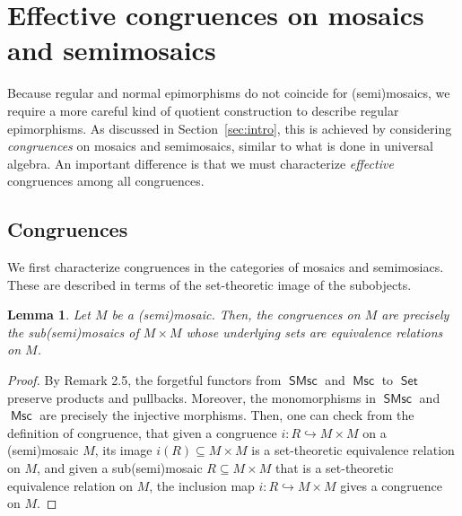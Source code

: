 \documentclass[reqno]{amsart}
\newcommand{\cat}[1]{\ensuremath{\mathsf{#1}}}
\DeclareMathOperator{\Set}{\cat{Set}}
\DeclareMathOperator{\Msc}{\cat{Msc}}
\DeclareMathOperator{\SMsc}{\cat{SMsc}}
\numberwithin{equation}{section}
\theoremstyle{plain}
\newtheorem{lemma}[equation]{Lemma}
\theoremstyle{definition}
\begin{document}
\section{Effective congruences on mosaics and semimosaics}
\label{sec:congruences}


Because regular and normal epimorphisms do not coincide for (semi)mosaics, we require a more careful kind of quotient construction to describe regular epimorphisms. 
As discussed in Section~\ref{sec:intro}, this is achieved by considering \emph{congruences} on mosaics and semimosaics, similar to what is done in universal algebra. 
An important difference is that we must characterize \emph{effective} congruences among all congruences.



\subsection{Congruences}


We first characterize congruences in the categories of mosaics and semimosiacs. These are described in terms of the set-theoretic image of the subobjects.



\begin{lemma}\label{lem:congruences}
    Let $M$ be a (semi)mosaic. Then, the congruences on $M$ are precisely the sub(semi)mosaics of $M\times M$ whose underlying sets are equivalence relations on $M$.
\end{lemma}

\begin{proof}
     By Remark 2.5, the forgetful functors from $\SMsc$ and $\Msc$ to $\Set$ preserve products and pullbacks. Moreover, the monomorphisms in $\SMsc$ and $\Msc$ are precisely the injective morphisms. Then, one can check from the definition of congruence, that given a congruence $i: R \hookrightarrow M\times M$ on a (semi)mosaic $M$, its image $i(R)\subseteq M\times M$ is a set-theoretic equivalence relation on $M$, and given a sub(semi)mosaic $R \subseteq M\times M$ that is a set-theoretic equivalence relation on $M$, the inclusion map $i:R\hookrightarrow M\times M$ gives a congruence on $M$.
\end{proof}
\end{document}

